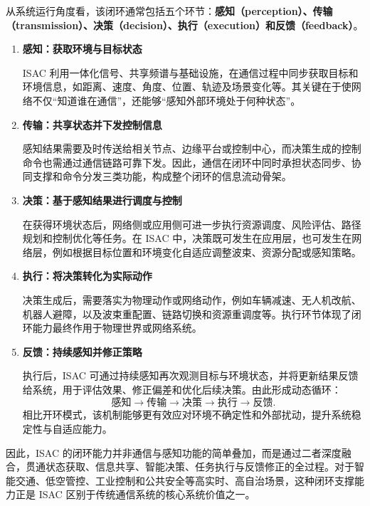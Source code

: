 从系统运行角度看，该闭环通常包括五个环节：\textbf{感知（perception）、传输（transmission）、决策（decision）、执行（execution）和反馈（feedback）}。

\begin{enumerate}[label=(\arabic*)]
\item \textbf{感知：获取环境与目标状态}

ISAC 利用一体化信号、共享频谱与基础设施，在通信过程中同步获取目标和环境信息，如距离、速度、角度、位置、轨迹及场景变化等\cite{Sturm2011WaveformDesign, Hassanien2016signaling, Liu2022ISAC}。其关键在于使网络不仅“知道谁在通信”，还能够“感知外部环境处于何种状态”。

\item \textbf{传输：共享状态并下发控制信息}

感知结果需要及时传送给相关节点、边缘平台或控制中心，而决策生成的控制命令也需通过通信链路可靠下发。因此，通信在闭环中同时承担状态同步、协同支撑和命令分发三类功能，构成整个闭环的信息流动骨架\cite{ITU2030, IMT2030Framework}。

\item \textbf{决策：基于感知结果进行调度与控制}

在获得环境状态后，网络侧或应用侧可进一步执行资源调度、风险评估、路径规划和控制优化等任务\cite{Letaief2019Roadmap, Saad2020Vision6G}。在 ISAC 中，决策既可发生在应用层，也可发生在网络层，例如根据目标位置和环境变化自适应调整波束、资源分配或感知策略。

\item \textbf{执行：将决策转化为实际动作}

决策生成后，需要落实为物理动作或网络动作，例如车辆减速、无人机改航、机器人避障，以及波束重配置、链路切换和资源重调度等\cite{Saad2020Vision6G}。执行环节体现了闭环能力最终作用于物理世界或网络系统。

\item \textbf{反馈：持续感知并修正策略}

执行后，ISAC 可通过持续感知再次观测目标与环境状态，并将更新结果反馈给系统，用于评估效果、修正偏差和优化后续决策\cite{Zhang2021ISAC6G}。由此形成动态循环：
\[
\text{感知} \rightarrow \text{传输} \rightarrow \text{决策} \rightarrow \text{执行} \rightarrow \text{反馈}.
\]
相比开环模式，该机制能够更有效应对环境不确定性和外部扰动，提升系统稳定性与自适应能力\cite{Saad2020Vision6G}。
\end{enumerate}

因此，ISAC 的闭环能力并非通信与感知功能的简单叠加，而是通过二者深度融合，贯通状态获取、信息共享、智能决策、任务执行与反馈修正的全过程\cite{Liu2022ISAC, Feng2020JointRadarCommunication}。对于智能交通、低空管控、工业控制和公共安全等高实时、高自治场景，这种闭环支撑能力正是 ISAC 区别于传统通信系统的核心系统价值之一。

